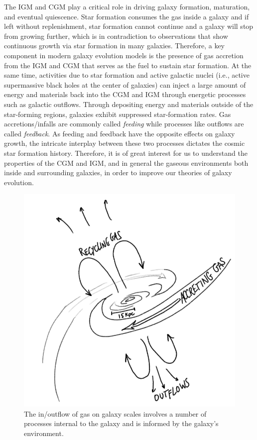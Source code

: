 The IGM and CGM play a critical role in driving galaxy formation, maturation, and eventual quiescence. Star formation consumes the gas inside a galaxy and if left without replenishment, star formation cannot continue and a galaxy will stop from growing further, which is in contradiction to observations that show continuous growth via star formation in many galaxies. Therefore, a key component in modern galaxy evolution models is the presence of gas accretion from the IGM and CGM that serves as the fuel to sustain star formation.  At the same time, activities due to star formation and active galactic nuclei (i.e., active supermassive black holes at the center of galaxies) can inject a large amount of energy and materials back into the CGM and IGM through energetic processes such as galactic outflows. Through depositing energy and materials outside of the star-forming regions, galaxies exhibit suppressed star-formation rates.  Gas accretions/infalls are commonly called {\it feeding} while processes like outflows are called {\it feedback}. As feeding and feedback have the opposite effects on galaxy growth, the intricate interplay between these two processes dictates the cosmic star formation history. Therefore, it is of great interest for us to understand the properties of the CGM and IGM, and in general the gaseous environments both inside and surrounding galaxies, in order to improve our theories of galaxy evolution.


\begin{figure}
    \centering
    \includegraphics[width=0.75\linewidth]{img/galaxy_outflow.png}
    \caption{The in/outflow of gas on galaxy scales involves a number of processes internal to the galaxy and is informed by the galaxy's environment.}
    \label{fig:galaxy_outflow}
\end{figure}

